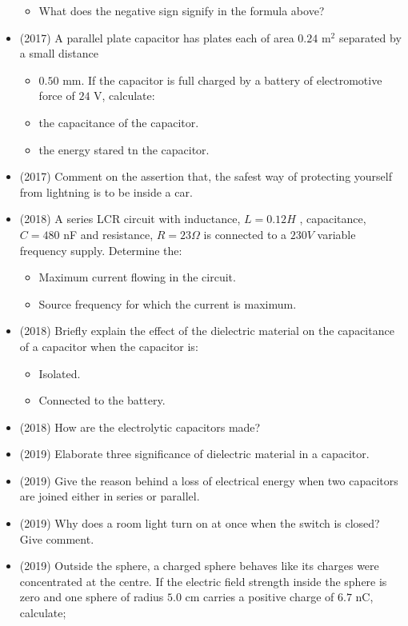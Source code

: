 \documentclass{article}
\begin{document}
\begin{itemize}
\begin{itemize}
\item What does the negative sign signify in the formula above?
\end{itemize}
\item (2017)  A parallel plate capacitor has plates each of area $ 0.24$ m$ ^{2}$ separated by a small distance\begin{itemize}
\item $ 0.50$ mm. If the capacitor is full charged by a battery of electromotive force of $ 24$ V, calculate:
\item the capacitance of the capacitor. 
\item the energy stared tn the capacitor. 
\end{itemize}
\item (2017)  Comment on the assertion that, the safest way of protecting yourself from lightning is to be inside a car. 
\item (2018)  A series LCR circuit with inductance, $ L=0.12H$ , capacitance, $ C=480$ nF and resistance, $ R=23\Omega $ is connected to a $ 230V$ variable frequency supply. Determine the:\begin{itemize}
\item Maximum current flowing in the circuit. 
\item Source frequency for which the current is maximum. 
\end{itemize}
\item (2018)  Briefly explain the effect of the dielectric material on the capacitance of a capacitor when the capacitor is:\begin{itemize}
\item Isolated. 
\item Connected to the battery.
\end{itemize}
\item (2018)  How are the electrolytic capacitors made? 
\item (2019)  Elaborate three significance of dielectric material in a capacitor. 
\item (2019)  Give the reason behind a loss of electrical energy when two capacitors are joined either in series or parallel. 
\item (2019)  Why does a room light turn on at once when the switch is closed? Give comment.
\item (2019)  Outside the sphere, a charged sphere behaves like its charges were concentrated at the centre. If the electric field strength inside the sphere is zero and one sphere of radius $ 5.0$ cm carries a positive charge of $ 6.7$ nC, calculate; \begin{itemize}

\end{itemize}
\end{itemize}
\end{document}

